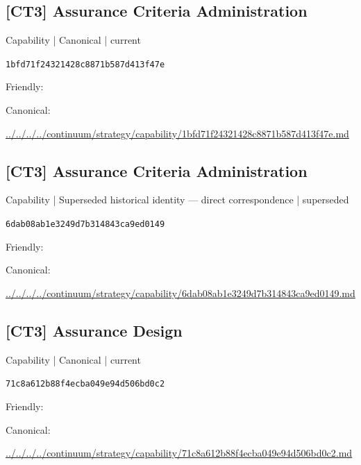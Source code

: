 \documentclass[10pt,a4paper]{article}
\begin{document}
\subsection*{[CT3] Assurance Criteria Administration}
{\small Capability | Canonical | current}\par
\texttt{1bfd71f24321428c8871b587d413f47e}\par
Friendly: \par
Canonical: \par
{\footnotesize\url{../../../../continuum/strategy/capability/1bfd71f24321428c8871b587d413f47e.md}}\par
\subsection*{[CT3] Assurance Criteria Administration}
{\small Capability | Superseded historical identity — direct correspondence | superseded}\par
\texttt{6dab08ab1e3249d7b314843ca9ed0149}\par
Friendly: \par
Canonical: \par
{\footnotesize\url{../../../../continuum/strategy/capability/6dab08ab1e3249d7b314843ca9ed0149.md}}\par
\subsection*{[CT3] Assurance Design}
{\small Capability | Canonical | current}\par
\texttt{71c8a612b88f4ecba049e94d506bd0c2}\par
Friendly: \par
Canonical: \par
{\footnotesize\url{../../../../continuum/strategy/capability/71c8a612b88f4ecba049e94d506bd0c2.md}}\par
\end{document}
